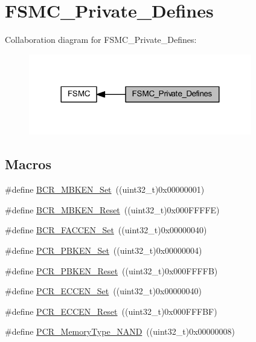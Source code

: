 \hypertarget{group___f_s_m_c___private___defines}{}\section{F\+S\+M\+C\+\_\+\+Private\+\_\+\+Defines}
\label{group___f_s_m_c___private___defines}
Collaboration diagram for F\+S\+M\+C\+\_\+\+Private\+\_\+\+Defines\+:
\nopagebreak
\begin{figure}[H]
\begin{center}
\leavevmode
\includegraphics[width=276pt]{group___f_s_m_c___private___defines}
\end{center}
\end{figure}
\subsection*{Macros}
\begin{DoxyCompactItemize}
\item 
\#define \hyperlink{group___f_s_m_c___private___defines_ga3c427afcf32b17fb72be67fd4638e6d5}{B\+C\+R\+\_\+\+M\+B\+K\+E\+N\+\_\+\+Set}~((uint32\+\_\+t)0x00000001)
\item 
\#define \hyperlink{group___f_s_m_c___private___defines_gaa63b72d32a32c53a057ee0a45bed0d3b}{B\+C\+R\+\_\+\+M\+B\+K\+E\+N\+\_\+\+Reset}~((uint32\+\_\+t)0x000\+F\+F\+F\+F\+E)
\item 
\#define \hyperlink{group___f_s_m_c___private___defines_ga38da33a73789b2c932962d75dfc1341f}{B\+C\+R\+\_\+\+F\+A\+C\+C\+E\+N\+\_\+\+Set}~((uint32\+\_\+t)0x00000040)
\item 
\#define \hyperlink{group___f_s_m_c___private___defines_gade871050f882b7f48582084b0e95f67c}{P\+C\+R\+\_\+\+P\+B\+K\+E\+N\+\_\+\+Set}~((uint32\+\_\+t)0x00000004)
\item 
\#define \hyperlink{group___f_s_m_c___private___defines_gac6d0ddc3888a0554b032f0f484cfe332}{P\+C\+R\+\_\+\+P\+B\+K\+E\+N\+\_\+\+Reset}~((uint32\+\_\+t)0x000\+F\+F\+F\+F\+B)
\item 
\#define \hyperlink{group___f_s_m_c___private___defines_ga8a0d7950936e3869b449d421e03a19ac}{P\+C\+R\+\_\+\+E\+C\+C\+E\+N\+\_\+\+Set}~((uint32\+\_\+t)0x00000040)
\item 
\#define \hyperlink{group___f_s_m_c___private___defines_gaca1a5c5cd46c8a32dab58c3eb3b865fa}{P\+C\+R\+\_\+\+E\+C\+C\+E\+N\+\_\+\+Reset}~((uint32\+\_\+t)0x000\+F\+F\+F\+B\+F)
\item 
\#define \hyperlink{group___f_s_m_c___private___defines_gaf3992efb285ab994c41463af5107c501}{P\+C\+R\+\_\+\+Memory\+Type\+\_\+\+N\+A\+ND}~((uint32\+\_\+t)0x00000008)
\end{DoxyCompactItemize}


